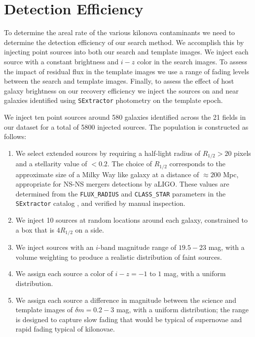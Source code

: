 \section{Detection Efficiency}
\label{sec:ch3_fakes}
To determine the areal rate of the various kilonova contaminants we need to determine the detection efficiency of our search method. We accomplish this by injecting point sources into both our search and template images. We inject each source with a constant brightness and $i-z$ color in the search images. To assess the impact of residual flux in the template images we use a range of fading levels between the search and template images.  Finally, to assess the effect of host galaxy brightness on our recovery efficiency we inject the sources on and near galaxies identified using {\tt SExtractor} photometry on the template epoch.

We inject ten point sources around 580 galaxies identified across the 21 fields in our dataset for a total of 5800 injected sources. The population is constructed as follows:

\begin{enumerate}
\item We select extended sources by requiring a half-light radius of $R_{1/2} > 20$ pixels and a stellarity value of $<0.2$. The choice of $R_{1/2}$ corresponds to the approximate size of a Milky Way like galaxy at a distance of $\approx 200$ Mpc, appropriate for NS-NS mergers detections by aLIGO. These values are determined from the {\tt FLUX\_RADIUS} and {\tt CLASS\_STAR} parameters in the {\tt SExtractor} catalog \citep{BertinArnouts96}, and verified by manual inspection.

\item We inject 10 sources at random locations around each galaxy, constrained to a box that is $4R_{1/2}$ on a side.

\item We inject sources with an $i$-band magnitude range of $19.5-23$ mag, with a volume weighting to produce a realistic distribution of faint sources.

\item We assign each source a color of $i-z=-1$ to $1$ mag, with a uniform distribution.

\item We assign each source a difference in magnitude between the science and template images of $\delta m= 0.2-3$ mag, with a uniform distribution; the range is designed to capture slow fading that would be typical of supernovae and rapid fading typical of kilonovae.

\end{enumerate}

